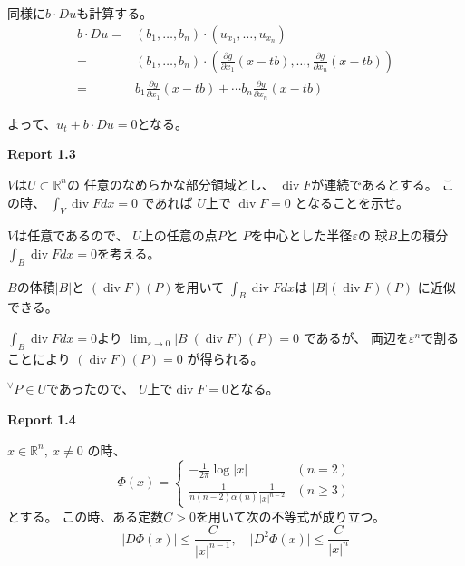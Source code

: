 \documentclass[12pt,b5paper]{ltjsarticle}
\DeclareMathOperator{\Div}{div}
\begin{document}
同様に$b\cdot Du$も計算する。
\begin{align}
 b\cdot Du
 =& (b_{1},\dots,b_{n})\cdot(u_{x_{1}},\dots,u_{x_{n}})\\
 =& (b_{1},\dots,b_{n})\cdot\left(\frac{\partial g}{\partial x_{1}}(x-tb),\dots,\frac{\partial g}{\partial x_{n}}(x-tb) \right)\\
 =& b_{1}\frac{\partial g}{\partial x_{1}}(x-tb)+\cdots b_{n}\frac{\partial g}{\partial x_{n}}(x-tb)
\end{align}

よって、$u_{t}+b\cdot Du =0$となる。

\hrulefill

\newpage

\textbf{Report 1.3}

$V$は$U\subset\mathbb{R}^n$の
任意のなめらかな部分領域とし、
$\Div{F}$が連続であるとする。
この時、
$\displaystyle \int_{V}\Div{F}dx=0$
であれば
$U$上で
$\Div{F}=0$
となることを示せ。

\dotfill

$V$は任意であるので、
$U$上の任意の点$P$と
$P$を中心とした半径$\varepsilon$の
球$B$上の積分
$\int_{B}\Div{F}dx=0$を考える。

$B$の体積$\lvert B\rvert$と
$(\Div{F})(P)$を用いて
$\int_{B}\Div{F}dx$は
$\lvert B \rvert (\Div{F})(P)$
に近似できる。

$\int_{B}\Div{F}dx=0$より
$\lim_{\varepsilon\to 0}\lvert B \rvert (\Div{F})(P) =0$
であるが、
両辺を$\varepsilon^n$で割ることにより
$(\Div{F})(P) =0$
が得られる。

${}^{\forall}P\in U$であったので、
$U$上で$\Div{F}=0$となる。


\hrulefill

\textbf{Report 1.4}

$x\in\mathbb{R}^n,\ x\ne 0$
の時、
\begin{equation}
 \Phi(x) =
  \begin{cases}
   -\frac{1}{2\pi}\log{\lvert x \rvert} & (n=2)\\
   \frac{1}{n(n-2)\alpha(n)}\frac{1}{\lvert x \rvert^{n-2}} & (n\geq 3)
  \end{cases}
\end{equation}
とする。
この時、ある定数$C>0$を用いて次の不等式が成り立つ。
\begin{equation}
 \lvert D\Phi(x)\rvert \leq \frac{C}{\lvert x \rvert^{n-1}}
  ,\quad
 \lvert D^{2}\Phi(x)\rvert \leq \frac{C}{\lvert x \rvert^{n}}
\end{equation}


\dotfill
\end{document}
